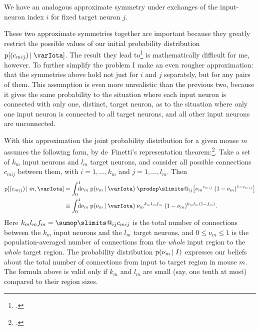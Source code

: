 \documentclass[\ifafour a4paper,12pt,\else a5paper,10pt,\fi%
onecolumn,oneside,article,%
british%
]{memoir}
\makeatletter
\theoremstyle{remark}
\theoremstyle{innote}
\def\sum{\DOTSI\sumop\slimits@}
\def\prod{\DOTSI\prodop\slimits@}
\newcommand*{\citep}{\footcites}
\newcommand*{\di}{\mathrm{d}}%
\renewcommand*{\le}{\leqslant}%
\newcommand*{\pf}{\mathrm{p}}%
\renewcommand*{\|}[1][]{\nonscript\,#1\vert\nonscript\;\mathopen{}}
\newcommand*{\yI}{\varIota}
\newcommand*{\yc}{c}
\newcommand*{\yf}{f}
\makeatother
\begin{document}
We have an analogous approximate symmetry under exchanges of the
input-neuron index $i$ for fixed target neuron $j$.

These two approximate symmetries together are important because they
greatly restrict the possible values of our initial probability
distribution $\pf[(\yc_{mij}) \| \yI]$. The result they lead
to\citep{hoover1979,aldous1981,diaconisetal1981b} is mathematically
difficult for me, however. To further simplify the problem I make an even
rougher approximation: that the symmetries above hold not just for $i$ and
$j$ separately, but for any pairs of them. This assumption is even more
unrealistic than the previous two, because it gives the same probability to
the situation where each input neuron is connected with only one, distinct,
target neuron, as to the situation where only one input neuron is connected
to all target neurons, and all other input neurons are unconnected.

With this approximation the joint probability distribution for a given
mouse $m$ assumes the following form, by de~Finetti's representation
theorem:\citep{definetti1930,hewittetal1955,heathetal1976,diaconis1977,diaconisetal1980,dawid2013}.
Take a set of $k_{m}$ input neurons and $l_{m}$ target neurons, and
consider all possible connections $\yc_{mij}$ between them, with
$i=1,\dotsc,k_{m}$ and $j=1,\dotsc,l_{m}$. Then
\begin{equation}
  \label{eq:definetti_ij}
  \begin{split}
  \pf[(\yc_{mij}) \| m, \yI] &=
  \int_{0}^{1}\!\!\!\!\di\nu_{m}\;\pf(\nu_{m} \| \yI)\;
  \prod_{ij}\bigl[
  {\nu_{m}}^{\yc_{mij}}\;(1-\nu_{m})^{1-\yc_{mij}}
  \bigr]
  \\
  &\equiv \int_{0}^{1}\!\!\!\!\di\nu_{m}\;\pf(\nu_{m} \| \yI)\;
  {\nu_{m}}^{k_{m}l_{m}\yf_{m}}\;
  (1-\nu_{m})^{k_{m}l_{m}(1-\yf_{m})}.
\end{split}
\end{equation}
Here $k_{m}l_{m}\yf_{m} = \sum_{ij} \yc_{mij}$ is the total number of
connections between the $k_{m}$ input neurons and the $l_{m}$ target
neurons, and $0\le \nu_{m} \le 1$ is the population-averaged number of
connections from the \emph{whole} input region to the \emph{whole} target
region. The probability distribution $\pf(\nu_{m} \| I)$ expresses our
beliefs about the total number of connections from input to target region
in mouse $m$. The formula above is valid only if $k_{m}$ and $l_{m}$ are
small (say, one tenth at most) compared to their region sizes.
\end{document}
